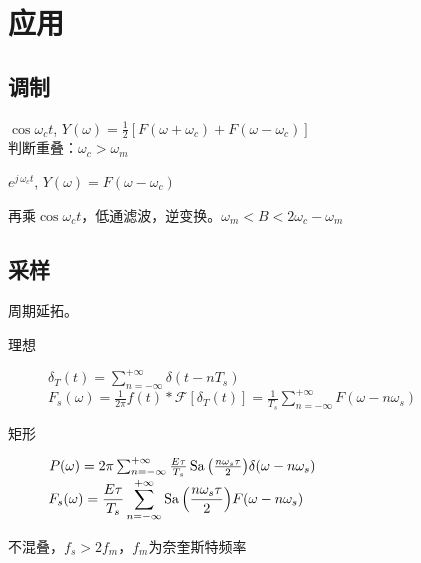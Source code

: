 \section{应用}

\subsection{调制}
\begin{description}
    \tightlist
    \item[正弦] \(\cos{\omega_c t}\), \(Y(\omega) = \frac{1}{2}[F(\omega+\omega_c)+F(\omega-\omega_c)]\)\\
    判断重叠：$\omega_c>\omega_m$
    \item[复指数] \(e^{j\,\omega_c t}\), \(Y(\omega) = F(\omega-\omega_c)\)
    \item[解调] 再乘\(\cos{\omega_c t}\)，低通滤波，逆变换。\(\omega_m<B<2\omega_c-\omega_m\)
\end{description}

\subsection{采样}

周期延拓。
\begin{description}
\item[理想] \(\delta_T(t)=\sum_{n=-\infty}^{+\infty}\delta(t-nT_s)\)
\(\displaystyle F_s(\omega) = \frac{1}{2\pi}f(t)*\mathcal F[\delta_T(t)] = \frac{1}{T_s}\sum_{n=-\infty}^{+\infty}F(\omega-n\omega_s)\)
\item[矩形]
\(P(\omega) = 2\pi\sum_{n=-\infty}^{+\infty} \frac{E\tau}{T_s} \operatorname{Sa}{\left(\frac{n\omega_s\tau}{2}\right)} \delta(\omega-n\omega_s)\)
\(\displaystyle F_s(\omega) = \frac{E\tau}{T_s} \sum_{n=-\infty}^{+\infty} \operatorname{Sa}{\left(\frac{n\omega_s\tau}{2}\right)} F(\omega-n\omega_s)\)
\end{description}

不混叠，\(f_s>2f_m\)，\(f_m\)为奈奎斯特频率
